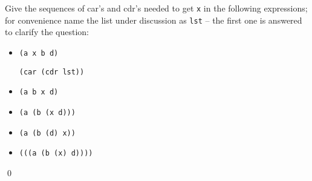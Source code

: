 \documentclass[a4paper,11pt]{article}
\begin{document}

\begin{uexercise}

Give the sequences of car's and cdr's needed to get \Verb+x+ in the following expressions; for convenience name the list under discussion as \Verb+lst+ -- the first one is answered to clarify the question:
\begin{itemize}
\item \Verb+(a x b d)+

 \Verb+(car (cdr lst))+

\item \Verb+(a b x d)+

\item \Verb+(a (b (x d)))+

\item \Verb+(a (b (d) x))+

\item \Verb+(((a (b (x) d))))+

\end{itemize}

\qed
\end{uexercise}
\end{document}
